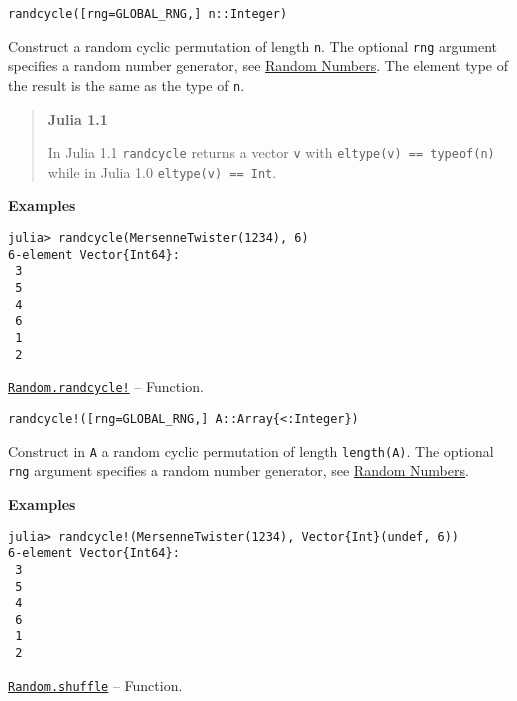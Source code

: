 \begin{adjustwidth}{2em}{0pt}


\begin{verbatim}
randcycle([rng=GLOBAL_RNG,] n::Integer)
\end{verbatim}

Construct a random cyclic permutation of length \texttt{n}. The optional \texttt{rng} argument specifies a random number generator, see \href{@ref}{Random Numbers}. The element type of the result is the same as the type of \texttt{n}.

\begin{quote}
\textbf{Julia 1.1}

In Julia 1.1 \texttt{randcycle} returns a vector \texttt{v} with \texttt{eltype(v) == typeof(n)} while in Julia 1.0 \texttt{eltype(v) == Int}.

\end{quote}
\textbf{Examples}


\begin{verbatim}
julia> randcycle(MersenneTwister(1234), 6)
6-element Vector{Int64}:
 3
 5
 4
 6
 1
 2
\end{verbatim}



\end{adjustwidth}
\hypertarget{6946208329788361422}{}
\hyperlink{6946208329788361422}{\texttt{Random.randcycle!}}  -- {Function.}

\begin{adjustwidth}{2em}{0pt}


\begin{verbatim}
randcycle!([rng=GLOBAL_RNG,] A::Array{<:Integer})
\end{verbatim}

Construct in \texttt{A} a random cyclic permutation of length \texttt{length(A)}. The optional \texttt{rng} argument specifies a random number generator, see \href{@ref}{Random Numbers}.

\textbf{Examples}


\begin{verbatim}
julia> randcycle!(MersenneTwister(1234), Vector{Int}(undef, 6))
6-element Vector{Int64}:
 3
 5
 4
 6
 1
 2
\end{verbatim}



\end{adjustwidth}
\hypertarget{16742615893822221762}{}
\hyperlink{16742615893822221762}{\texttt{Random.shuffle}}  -- {Function.}

